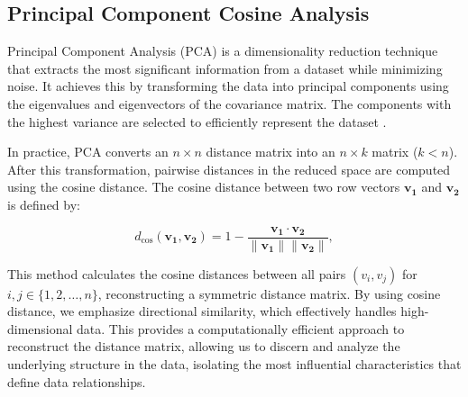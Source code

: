\subsection{Principal Component Cosine Analysis}
\label{subsec:pca-cosine}

Principal Component Analysis (PCA) is a dimensionality reduction technique that extracts the most significant information from a dataset while minimizing noise. It achieves this by transforming the data into principal components using the eigenvalues and eigenvectors of the covariance matrix. The components with the highest variance are selected to efficiently represent the dataset \cite{pearsonLIIILinesPlanes1901, jolliffePrincipalComponentAnalysis2002}.

In practice, PCA converts an \(n \times n\) distance matrix into an \(n \times k\) matrix (\(k < n\)). After this transformation, pairwise distances in the reduced space are computed using the cosine distance. The cosine distance between two row vectors \(\mathbf{v_1}\) and \(\mathbf{v_2}\) is defined by:

\begin{equation}
    d_{\cos}(\mathbf{v_1}, \mathbf{v_2}) = 1 - \frac{\mathbf{v_1} \cdot \mathbf{v_2}}{\|\mathbf{v_1}\| \|\mathbf{v_2}\|},
    \label{eq:cosine-distance}
\end{equation}

This method calculates the cosine distances between all pairs \((v_i, v_j)\) for \(i, j \in \{1, 2, \ldots, n\}\), reconstructing a symmetric distance matrix. By using cosine distance, we emphasize directional similarity, which effectively handles high-dimensional data. This provides a computationally efficient approach to reconstruct the distance matrix, allowing us to discern and analyze the underlying structure in the data, isolating the most influential characteristics that define data relationships.


